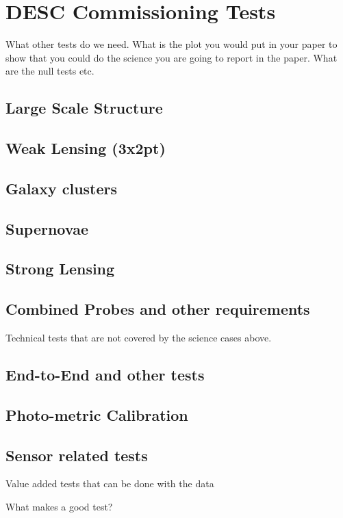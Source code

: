 \documentclass[modern]{desc-tex/styles/lsstdescnote}
\begin{document}
\section{DESC Commissioning Tests}

What other tests do we need. What is the plot you would put in your paper to show that you could do the science you are going to report in the paper. What are the null tests etc.

\subsection{Large Scale Structure}
\subsection{Weak Lensing (3x2pt)}
\subsection{Galaxy clusters}
\subsection{Supernovae}
\subsection{Strong Lensing}
\subsection{Combined Probes and other requirements}

Technical tests that are not covered by the science cases above.

\subsection{End-to-End and other tests}
\subsection{Photo-metric Calibration}
\subsection{Sensor related tests}

\appendix

Value added tests that can be done with the data

What makes a good test?
\end{document}
